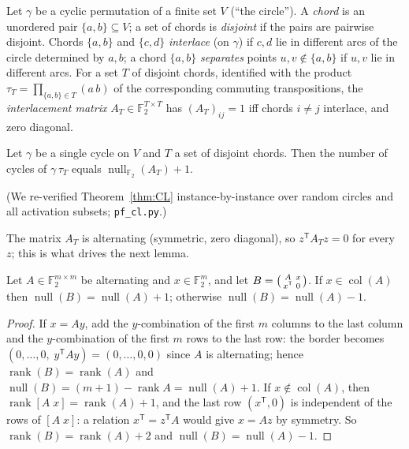 Let $\gamma$ be a cyclic permutation of a finite set $V$ (``the
circle'').  A \emph{chord} is an unordered pair $\{a,b\}\subseteq V$;
a set of chords is \emph{disjoint} if the pairs are pairwise disjoint.
Chords $\{a,b\}$ and $\{c,d\}$ \emph{interlace} (on $\gamma$) if $c,d$
lie in different arcs of the circle determined by $a,b$; a chord
$\{a,b\}$ \emph{separates} points $u,v\notin\{a,b\}$ if $u,v$ lie in
different arcs.  For a set $T$ of disjoint chords, identified with the
product $\tau_T=\prod_{\{a,b\}\in T}(a\,b)$ of the corresponding
commuting transpositions, the \emph{interlacement matrix}
$A_T\in\mathbb{F}_2^{T\times T}$ has $(A_T)_{ij}=1$ iff chords $i\neq
j$ interlace, and zero diagonal.

\begin{theorem}\label{thm:CL}
Let $\gamma$ be a single cycle on $V$ and $T$ a set of disjoint
chords.  Then the number of cycles of $\gamma\,\tau_T$ equals
$\operatorname{null}_{\mathbb{F}_2}(A_T)+1$.
\end{theorem}

(We re-verified Theorem~\ref{thm:CL} instance-by-instance over random
circles and all activation subsets; \texttt{pf\_cl.py}.)

The matrix $A_T$ is alternating (symmetric, zero diagonal), so
$z^{\mathsf T}A_Tz=0$ for every $z$; this is what drives the next
lemma.

\begin{lemma}\label{lem:border}
Let $A\in\mathbb{F}_2^{m\times m}$ be alternating and
$x\in\mathbb{F}_2^m$, and let
$B=\begin{psmallmatrix}A&x\\x^{\mathsf T}&0\end{psmallmatrix}$.  If
$x\in\operatorname{col}(A)$ then
$\operatorname{null}(B)=\operatorname{null}(A)+1$; otherwise
$\operatorname{null}(B)=\operatorname{null}(A)-1$.
\end{lemma}

\begin{proof}
If $x=Ay$, add the $y$-combination of the first $m$ columns to the
last column and the $y$-combination of the first $m$ rows to the last
row: the border becomes $(0,\dots,0,\;y^{\mathsf T}Ay)=(0,\dots,0,0)$
since $A$ is alternating; hence
$\operatorname{rank}(B)=\operatorname{rank}(A)$ and
$\operatorname{null}(B)=(m{+}1)-\operatorname{rank}A
=\operatorname{null}(A)+1$.  If $x\notin\operatorname{col}(A)$, then
$\operatorname{rank}[A\;x]=\operatorname{rank}(A)+1$, and the last row
$(x^{\mathsf T},0)$ is independent of the rows of $[A\;x]$: a relation
$x^{\mathsf T}=z^{\mathsf T}A$ would give $x=Az$ by symmetry.  So
$\operatorname{rank}(B)=\operatorname{rank}(A)+2$ and
$\operatorname{null}(B)=\operatorname{null}(A)-1$.
\end{proof}

